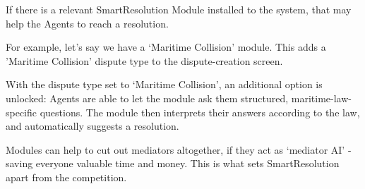 If there is a relevant SmartResolution Module installed to the system, that may help the Agents to reach a resolution.

For example, let's say we have a `Maritime Collision' module. This adds a 'Maritime Collision' dispute type to the dispute-creation screen.

With the dispute type set to `Maritime Collision', an additional option is unlocked: Agents are able to let the module ask them structured, maritime-law-specific questions. The module then interprets their answers according to the law, and automatically suggests a resolution.

Modules can help to cut out mediators altogether, if they act as `mediator AI' - saving everyone valuable time and money. This is what sets SmartResolution apart from the competition.
